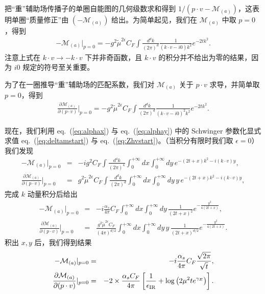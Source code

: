 把``重''辅助场传播子的单圈自能图的几何级数求和得到 $1/(p\cdot v - \mathcal{M}_{(a)})$，这表明单圈``质量修正''由 $(-\mathcal{M}_{(a)})$ 给出。为简单起见，我们在 $\mathcal{M}_{(a)}$ 中取 $p=0$，得到
\begin{eqnarray}
\label{eq:deltamstart}
-\mathcal{M}_{(a)}|_{p=0}= -g^2\tilde{\mu}^{2\epsilon}C_F\int\frac{d^dk}{(2\pi)^d}\frac{1}{\left(k\cdot v- i0\right)k^2} e^{-2tk^2}.
\end{eqnarray}
注意上式在 $k\cdot v\rightarrow -k\cdot v$ 下并非奇函数，且 $k\cdot v$ 的积分并不给出为零的结果，因为 $i0$ 规定的符号至关重要。

为了在一圈推导``重''辅助场的匹配系数，我们对 $\mathcal{M}_{(a)}$ 关于 $p\cdot v$ 求导，并简单取 $p=0$，得到
\begin{eqnarray}
\label{eq:Zhvstart}
\frac{\partial\mathcal{M}_{(a)}}{\partial (p\cdot v)}|_{p=0}= - g^2\tilde{\mu}^{2\epsilon}C_F\int\frac{d^dk}{(2\pi)^d}\frac{1}{\left(k\cdot v- i0\right)^2k^2} e^{-2tk^2}.
\end{eqnarray}

现在，我们利用 eq.~(\ref{eq:alphax}) 与 eq.~(\ref{eq:alphay}) 中的 Schwinger 参数化显式求值 eq.~(\ref{eq:deltamstart}) 与 eq.~(\ref{eq:Zhvstart})。（当积分有限时我们取 $\epsilon=0$）我们发现
\begin{eqnarray}
\label{eq:deltamcalc0}
-\mathcal{M}_{(a)}|_{p=0} &=& -ig^2C_F\int\frac{d^4k}{(2\pi)^4}\int_0^{+\infty}dx\int_0^{+\infty}dy\, e^{-(2t+x)k^2- i(k\cdot v)y},\\
\label{eq:Zhvcalc0}
\frac{\partial\mathcal{M}_{(a)}}{\partial (p\cdot v)}|_{p=0} &=& g^2\tilde{\mu}^{2\epsilon}C_F\int\frac{d^dk}{(2\pi)^d}\int_0^{+\infty}dx\int_0^{+\infty}dy\, y\, e^{-(2t+x)k^2- i(k\cdot v)y},
\end{eqnarray}
完成 $k$ 动量积分后给出
\begin{eqnarray}
\label{eq:deltamcalc1}
-\mathcal{M}_{(a)}|_{p=0} &=& -i\frac{\alpha_s}{4\pi}C_F\int_0^{+\infty}dx\int_0^{+\infty}dy\, \frac{1}{\left(2t +x\right)^2}e^{-\frac{y^2}{4\left(2t+x\right)}},\\
\label{eq:Zhvcal1}
\frac{\partial\mathcal{M}_{(a)}}{\partial (p\cdot v)}|_{p=0} &=& \frac{g^2\tilde{\mu}^{2\epsilon}C_F}{(4\pi)^{d/2}} \int_0^{+\infty}dx\int_0^{+\infty}dy\, y\, \frac{1}{\left(2t +x\right)^{d/2}}e^{-\frac{y^2}{4\left(2t+x\right)}}.
\end{eqnarray}
积出 $x, y$ 后，我们得到结果
\begin{eqnarray}
\label{eq:deltamresult0}
-\mathcal{M}_{(a)}|_{p=0}&=& -i\frac{\alpha_s}{4\pi}C_F\frac{\sqrt{2\pi}}{\sqrt{t}},\\
\label{eq:Zhvresult0}
\frac{\partial\mathcal{M}_{(a)}}{\partial (p\cdot v)}|_{p=0} &=& - 2\times\frac{\alpha_sC_F}{4\pi}\left[\frac{1}{\epsilon_{\rm IR}}+\log\left(2\mu^2 te^{\gamma_E}\right)\right].
\end{eqnarray}

